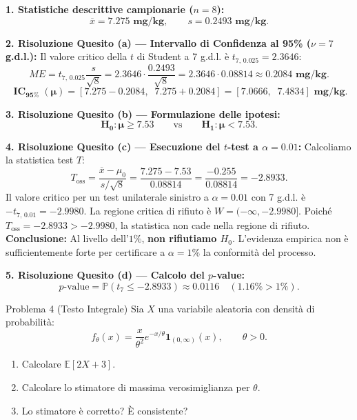\documentclass[11pt,a4paper]{article}
\newcommand{\EE}{\mathbb{E}}
\newcommand{\Prob}{\mathbb{P}}
\begin{document}
\begin{soluzionebox}
\textbf{1. Statistiche descrittive campionarie ($n = 8$):}
\[
\overline{x} = \mathbf{7.275\text{ mg/kg}}, \qquad s = \mathbf{0.2493\text{ mg/kg}}.
\]

\textbf{2. Risoluzione Quesito (a) --- Intervallo di Confidenza al 95\% ($\nu = 7$ g.d.l.):}
Il valore critico della $t$ di Student a 7 g.d.l. è $t_{7, \, 0.025} = 2.3646$:
\[
ME = t_{7, \, 0.025} \frac{s}{\sqrt{8}} = 2.3646 \cdot \frac{0.2493}{\sqrt{8}} = 2.3646 \cdot 0.08814 \approx \mathbf{0.2084\text{ mg/kg}}.
\]
\[
\mathbf{\operatorname{IC}_{95\%}(\mu) = [7.275 - 0.2084, \;\; 7.275 + 0.2084] = [7.0666, \;\; 7.4834]\text{ mg/kg}}.
\]

\textbf{3. Risoluzione Quesito (b) --- Formulazione delle ipotesi:}
\[
\mathbf{H_0: \mu \ge 7.53} \qquad \text{vs} \qquad \mathbf{H_1: \mu < 7.53}.
\]

\textbf{4. Risoluzione Quesito (c) --- Esecuzione del $t$-test a $\alpha = 0.01$:}
Calcoliamo la statistica test $T$:
\[
T_{\text{oss}} = \frac{\overline{x} - \mu_0}{s/\sqrt{8}} = \frac{7.275 - 7.53}{0.08814} = \frac{-0.255}{0.08814} = \mathbf{-2.8933}.
\]
Il valore critico per un test unilaterale sinistro a $\alpha = 0.01$ con 7 g.d.l. è $-t_{7, \, 0.01} = -2.9980$.
La regione critica di rifiuto è $W = (-\infty, -2.9980]$.
Poiché $T_{\text{oss}} = -2.8933 > -2.9980$, la statistica non cade nella regione di rifiuto.
\textbf{Conclusione:} Al livello dell'$1\%$, \textbf{non rifiutiamo $H_0$}. L'evidenza empirica non è sufficientemente forte per certificare a $\alpha=1\%$ la conformità del processo.

\textbf{5. Risoluzione Quesito (d) --- Calcolo del $p$-value:}
\[
p\text{-value} = \Prob(t_7 \le -2.8933) \approx \mathbf{0.0116} \quad (\mathbf{1.16\%} > 1\%).
\]
\end{soluzionebox}

\begin{problemabox}{Problema 4 (Testo Integrale)}
Sia $X$ una variabile aleatoria con densità di probabilità:
\[
f_\theta(x) = \frac{x}{\theta^2} e^{-x/\theta} \mathbf{1}_{(0,\infty)}(x), \qquad \theta > 0.
\]
\begin{enumerate}[label=(\alph*)]
    \item Calcolare $\EE[2X+3]$.
    \item Calcolare lo stimatore di massima verosimiglianza per $\theta$.
    \item Lo stimatore è corretto? È consistente?
\end{enumerate}
\end{problemabox}
\end{document}
